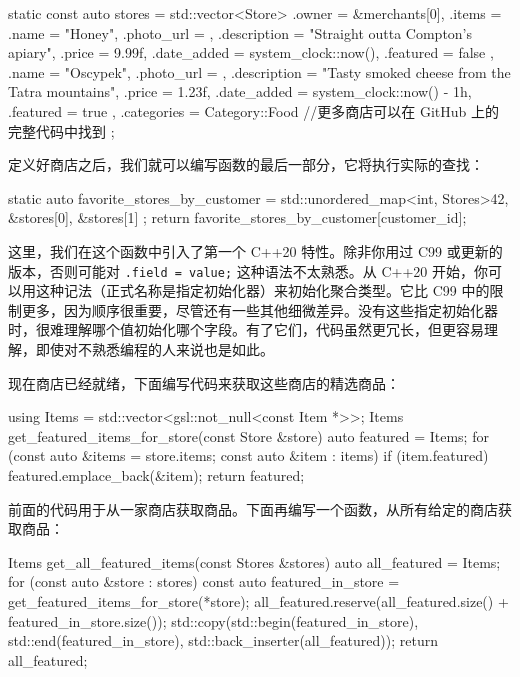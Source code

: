 \begin{codebox}[cpp]
static const auto stores = std::vector<Store>{
    {
        .owner = &merchants[0],
        .items = {
            {
                .name = "Honey",
                .photo_url = {},
                .description = "Straight outta Compton's apiary",
                .price = 9.99f,
                .date_added = system_clock::now(),
                .featured = false
            },
            {
                .name = "Oscypek",
                .photo_url = {},
                .description = "Tasty smoked cheese from the Tatra mountains",
                .price = 1.23f,
                .date_added = system_clock::now() - 1h,
                .featured = true
            }
        },
        .categories = {Category::Food}
    }
    //更多商店可以在 GitHub 上的完整代码中找到
};
\end{codebox}

定义好商店之后，我们就可以编写函数的最后一部分，它将执行实际的查找：

\begin{codebox}[cpp]
static auto favorite_stores_by_customer =
    std::unordered_map<int, Stores>{{42, {&stores[0], &stores[1]}}
    };
return favorite_stores_by_customer[customer_id];
\end{codebox}

\label{idx:489}
\label{idx:490}
\label{idx:491}
这里，我们在这个函数中引入了第一个 C++20 特性。除非你用过 C99 或更新的版本，否则可能对 \texttt{.\allowbreak{}field =\allowbreak{} value;\allowbreak{}} 这种语法不太熟悉。从 C++20 开始，你可以用这种记法（正式名称是指定初始化器）来初始化聚合类型。它比 C99 中的限制更多，因为顺序很重要，尽管还有一些其他细微差异。没有这些指定初始化器时，很难理解哪个值初始化哪个字段。有了它们，代码虽然更冗长，但更容易理解，即使对不熟悉编程的人来说也是如此。

现在商店已经就绪，下面编写代码来获取这些商店的精选商品：

\begin{codebox}[cpp]
using Items = std::vector<gsl::not_null<const Item *>>;
Items get_featured_items_for_store(const Store &store) {
    auto featured = Items{};
    for (const auto &items = store.items; const auto &item : items) {
        if (item.featured) {
            featured.emplace_back(&item);
        }
    }
    return featured;
}
\end{codebox}

前面的代码用于从一家商店获取商品。下面再编写一个函数，从所有给定的商店获取商品：

\begin{codebox}[cpp]
Items get_all_featured_items(const Stores &stores) {
    auto all_featured = Items{};
    for (const auto &store : stores) {
        const auto featured_in_store = get_featured_items_for_store(*store);
        all_featured.reserve(all_featured.size() + featured_in_store.size());
        std::copy(std::begin(featured_in_store), std::end(featured_in_store), std::back_inserter(all_featured));
    }
    return all_featured;
}
\end{codebox}

